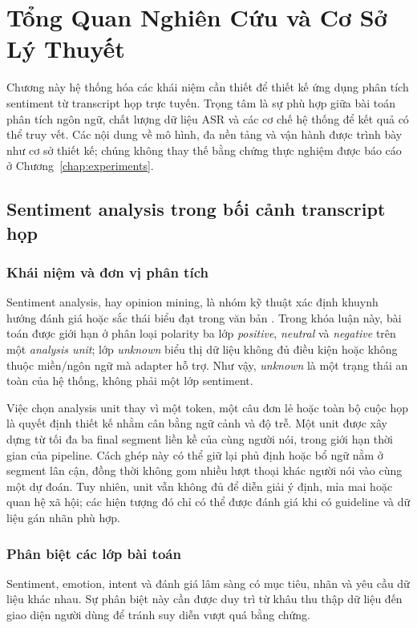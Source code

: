 \chapter{Tổng Quan Nghiên Cứu và Cơ Sở Lý Thuyết}
\label{chap:literature}

Chương này hệ thống hóa các khái niệm cần thiết để thiết kế ứng dụng phân tích sentiment từ transcript họp trực tuyến. Trọng tâm là sự phù hợp giữa bài toán phân tích ngôn ngữ, chất lượng dữ liệu ASR và các cơ chế hệ thống để kết quả có thể truy vết. Các nội dung về mô hình, đa nền tảng và vận hành được trình bày như cơ sở thiết kế; chúng không thay thế bằng chứng thực nghiệm được báo cáo ở Chương~\ref{chap:experiments}.

\section{Sentiment analysis trong bối cảnh transcript họp}
\subsection{Khái niệm và đơn vị phân tích}
Sentiment analysis, hay opinion mining, là nhóm kỹ thuật xác định khuynh hướng đánh giá hoặc sắc thái biểu đạt trong văn bản \cite{pang2008}. Trong khóa luận này, bài toán được giới hạn ở phân loại polarity ba lớp \textit{positive}, \textit{neutral} và \textit{negative} trên một \emph{analysis unit}; lớp \textit{unknown} biểu thị dữ liệu không đủ điều kiện hoặc không thuộc miền/ngôn ngữ mà adapter hỗ trợ. Như vậy, \textit{unknown} là một trạng thái an toàn của hệ thống, không phải một lớp sentiment.

Việc chọn analysis unit thay vì một token, một câu đơn lẻ hoặc toàn bộ cuộc họp là quyết định thiết kế nhằm cân bằng ngữ cảnh và độ trễ. Một unit được xây dựng từ tối đa ba final segment liền kề của cùng người nói, trong giới hạn thời gian của pipeline. Cách ghép này có thể giữ lại phủ định hoặc bổ ngữ nằm ở segment lân cận, đồng thời không gom nhiều lượt thoại khác người nói vào cùng một dự đoán. Tuy nhiên, unit vẫn không đủ để diễn giải ý định, mỉa mai hoặc quan hệ xã hội; các hiện tượng đó chỉ có thể được đánh giá khi có guideline và dữ liệu gán nhãn phù hợp.

\subsection{Phân biệt các lớp bài toán}
Sentiment, emotion, intent và đánh giá lâm sàng có mục tiêu, nhãn và yêu cầu dữ liệu khác nhau. Sự phân biệt này cần được duy trì từ khâu thu thập dữ liệu đến giao diện người dùng để tránh suy diễn vượt quá bằng chứng.

